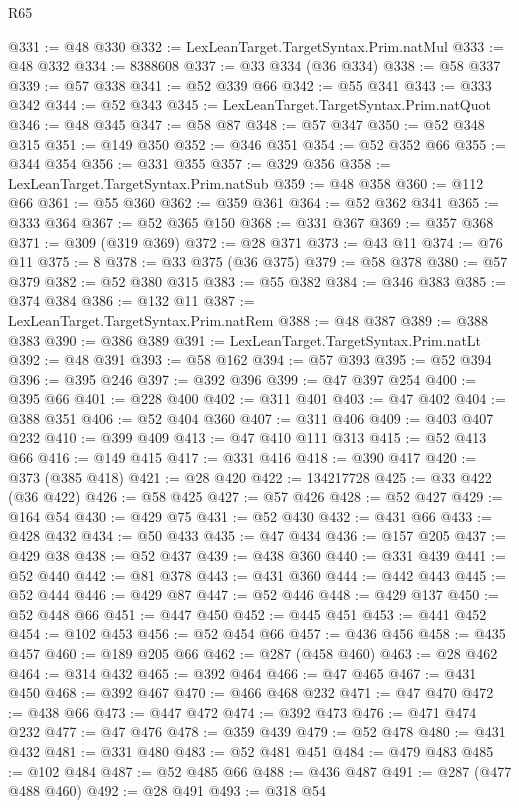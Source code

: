 \begin{lexlean}{R65}
\begin{coremodule}
@331 := @48 @330
@332 := LexLeanTarget.TargetSyntax.Prim.natMul
@333 := @48 @332
@334 := 8388608
@337 := @33 @334 (@36 @334)
@338 := @58 @337
@339 := @57 @338
@341 := @52 @339 @66
@342 := @55 @341
@343 := @333 @342
@344 := @52 @343
@345 := LexLeanTarget.TargetSyntax.Prim.natQuot
@346 := @48 @345
@347 := @58 @87
@348 := @57 @347
@350 := @52 @348 @315
@351 := @149 @350
@352 := @346 @351
@354 := @52 @352 @66
@355 := @344 @354
@356 := @331 @355
@357 := @329 @356
@358 := LexLeanTarget.TargetSyntax.Prim.natSub
@359 := @48 @358
@360 := @112 @66
@361 := @55 @360
@362 := @359 @361
@364 := @52 @362 @341
@365 := @333 @364
@367 := @52 @365 @150
@368 := @331 @367
@369 := @357 @368
@371 := @309 (@319 @369)
@372 := @28 @371
@373 := @43 @11
@374 := @76 @11
@375 := 8
@378 := @33 @375 (@36 @375)
@379 := @58 @378
@380 := @57 @379
@382 := @52 @380 @315
@383 := @55 @382
@384 := @346 @383
@385 := @374 @384
@386 := @132 @11
@387 := LexLeanTarget.TargetSyntax.Prim.natRem
@388 := @48 @387
@389 := @388 @383
@390 := @386 @389
@391 := LexLeanTarget.TargetSyntax.Prim.natLt
@392 := @48 @391
@393 := @58 @162
@394 := @57 @393
@395 := @52 @394
@396 := @395 @246
@397 := @392 @396
@399 := @47 @397 @254
@400 := @395 @66
@401 := @228 @400
@402 := @311 @401
@403 := @47 @402
@404 := @388 @351
@406 := @52 @404 @360
@407 := @311 @406
@409 := @403 @407 @232
@410 := @399 @409
@413 := @47 @410 @111 @313
@415 := @52 @413 @66
@416 := @149 @415
@417 := @331 @416
@418 := @390 @417
@420 := @373 (@385 @418)
@421 := @28 @420
@422 := 134217728
@425 := @33 @422 (@36 @422)
@426 := @58 @425
@427 := @57 @426
@428 := @52 @427
@429 := @164 @54
@430 := @429 @75
@431 := @52 @430
@432 := @431 @66
@433 := @428 @432
@434 := @50 @433
@435 := @47 @434
@436 := @157 @205
@437 := @429 @38
@438 := @52 @437
@439 := @438 @360
@440 := @331 @439
@441 := @52 @440
@442 := @81 @378
@443 := @431 @360
@444 := @442 @443
@445 := @52 @444
@446 := @429 @87
@447 := @52 @446
@448 := @429 @137
@450 := @52 @448 @66
@451 := @447 @450
@452 := @445 @451
@453 := @441 @452
@454 := @102 @453
@456 := @52 @454 @66
@457 := @436 @456
@458 := @435 @457
@460 := @189 @205 @66
@462 := @287 (@458 @460)
@463 := @28 @462
@464 := @314 @432
@465 := @392 @464
@466 := @47 @465
@467 := @431 @450
@468 := @392 @467
@470 := @466 @468 @232
@471 := @47 @470
@472 := @438 @66
@473 := @447 @472
@474 := @392 @473
@476 := @471 @474 @232
@477 := @47 @476
@478 := @359 @439
@479 := @52 @478
@480 := @431 @432
@481 := @331 @480
@483 := @52 @481 @451
@484 := @479 @483
@485 := @102 @484
@487 := @52 @485 @66
@488 := @436 @487
@491 := @287 (@477 @488 @460)
@492 := @28 @491
@493 := @318 @54

\end{coremodule}
\end{lexlean}
